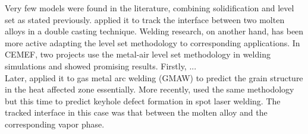 Very few models were found in the literature, combining solidification and level set as stated previously. 
\citet{du_simulating_2001} applied it to track the interface between two molten alloys in a double casting technique. 
Welding research, on another hand, has been more active adapting the level set methodology to corresponding applications. 
In CEMEF, two projects use the metal-air level set methodology in welding simulations and showed promising results. 
Firstly, \citet{desmaison_level_2014} ... \\ %
Later, \citet{chen_three_2014} applied it to gas metal arc welding (GMAW) to predict 
the grain structure in the heat affected zone essentially.
More recently, \citet{courtois_complete_2014} used the same methodology but this time to predict keyhole defect formation
in spot laser welding. The tracked interface in this case was that between the molten alloy and the corresponding vapor phase.
%
%
